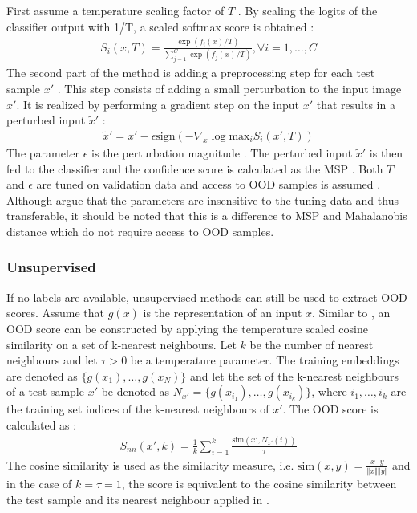 First assume a temperature scaling factor of $T$ \citep{Liang2018}.
By scaling the logits of the classifier output with 1/T, a scaled softmax score is obtained \citep{Liang2018}:
\begin{align}
	S_i(x,T) = \frac{\exp(f_i(x)/T)}{\sum_{j=1}^{C}\exp(f_j(x)/T)}, \forall i=1,\dots,C
\end{align}
The second part of the method is adding a preprocessing step for each test sample $x'$ \citep{Liang2018}.
This step consists of adding a small perturbation to the input image $x'$.
It is realized by performing a gradient step on the input $x'$ that results in a perturbed input $\tilde{x}'$ \citep{Liang2018}: 
\begin{align}
	\tilde{x}' = x' - \epsilon \text{sign}(-\nabla_x \log \text{max}_i  S_i(x',T))
\end{align}
The parameter $\epsilon$ is the perturbation magnitude \citep{Liang2018}.
The perturbed input $\tilde{x}'$ is then fed to the classifier and the confidence score is calculated as the MSP \citep{Liang2018}.
Both $T$ and $\epsilon$ are tuned on validation data and access to OOD samples is assumed \citep{Liang2018,Hsu2020}.
Although \citep{Liang2018} argue that the parameters are insensitive to the tuning data and thus transferable, it should be noted that this is a difference to MSP and Mahalanobis distance which do not require access to OOD samples.
\subsubsection{Unsupervised}
If no labels are available, unsupervised methods can still be used to extract OOD scores.
Assume that $g(x)$ is the representation of an input $x$.
Similar to \citep{Michels2023,Sun2022}, an OOD score can be constructed by applying the temperature scaled cosine similarity on a set of k-nearest neighbours.
Let $k$ be the number of nearest neighbours and let $\tau>0$ be a temperature parameter.
The training embeddings are denoted as $\{g(x_1),\dots,g(x_N)\}$ and let the set of the k-nearest neighbours of a test sample $x'$ be denoted as $N_{x'} = \{g(x_{i_1}),\dots,g(x_{i_k})\}$, where $i_1,\dots,i_k$ are the training set indices of the k-nearest neighbours of $x'$.
The OOD score is calculated as \citep{Michels2023,Sun2022}:
\begin{align}
	S_{nn}(x',k) = \frac{1}{k}\sum_{i=1}^k \frac{\text{sim}(x',N_{x'}(i))}{\tau}
	\label{equation:knn-score}
\end{align}
The cosine similarity is used as the similarity measure, i.e. $\text{sim}(x,y) = \frac{x\cdot y}{\Vert x \Vert \Vert y \Vert}$ and in the case of $k=\tau=1$, the score is equivalent to the cosine similarity between the test sample and its nearest neighbour applied in \citep{Michels2023}.
